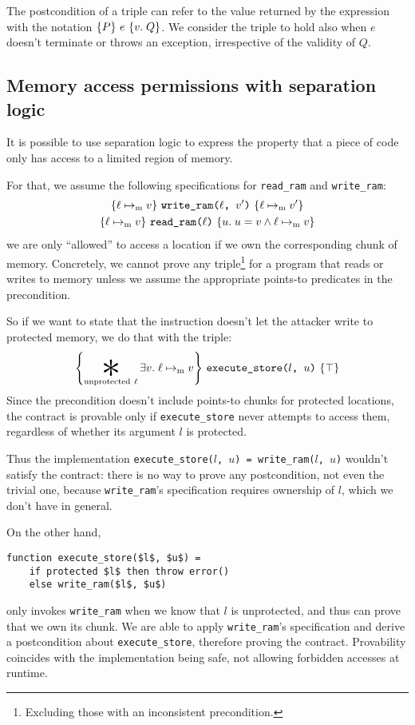 The postcondition of a triple can refer to the value returned by the expression with the notation \(\hoare{P}{e}[v]{Q}\). We consider the triple to hold also when \(e\) doesn't terminate or throws an exception, irrespective of the validity of \(Q\).

\subsection{Memory access permissions with separation logic}

It is possible to use separation logic to express the property that a piece of code only has access to a limited region of memory.

For that, we assume the following specifications for \texttt{read\_ram} and \texttt{write\_ram}:
\begin{gather*}
  \hoare{\ell \ptom v}{\texttt{write\_ram($\ell$, $v'$)}}{\ell \ptom v'} \\
  \hoare{\ell \ptom v}{\texttt{read\_ram($\ell$)}}[u]{u = v \wedge \ell \ptom v}
\end{gather*}
we are only ``allowed'' to access a location if we own the corresponding chunk of memory. Concretely, we cannot prove any triple\footnote{Excluding those with an inconsistent precondition.} for a program that reads or writes to memory unless we assume the appropriate points-to predicates in the precondition.

So if we want to state that the  instruction doesn't let the attacker write to protected memory, we do that with the triple:
\[ \hoare{\bigast_{\smash{\mathrm{unprotected}~\ell}} \exists v.\; \ell \ptom v}{\texttt{execute\_store($l$, $u$)}}{\top}\]
Since the precondition doesn't include points-to chunks for protected locations, the contract is provable only if \texttt{execute\_store} never attempts to access them, regardless of whether its argument \(l\) is protected.

Thus the implementation \texttt{execute\_store(\(l\), \(u\)) = write\_ram(\(l\), \(u\))} wouldn't satisfy the contract: there is no way to prove any postcondition, not even the trivial one, because \texttt{write\_ram}'s specification requires ownership of \(l\), which we don't have in general.

On the other hand,
\begin{lstlisting}[language=sail, mathescape]
  function execute_store($l$, $u$) =
    if protected $l$ then throw error()
    else write_ram($l$, $u$)
\end{lstlisting}
only invokes \texttt{write\_ram} when we know that \(l\) is unprotected, and thus can prove that we own its chunk. We are able to apply \texttt{write\_ram}'s specification and derive a postcondition about \texttt{execute\_store}, therefore proving the contract. Provability coincides with the implementation being safe, \ie not allowing forbidden accesses at runtime.


